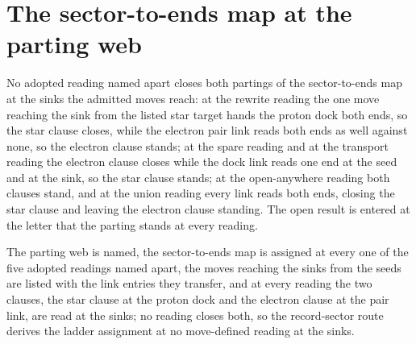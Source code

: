 \section{The sector-to-ends map at the parting web}\label{mod:I-5-D534928-w-smrp}
\begin{chwall}\label{box:I-5-D534928-w-smrp:1}
No adopted reading named apart closes both partings of the sector-to-ends map at the sinks the admitted moves reach: at the rewrite reading the one move reaching the sink from the listed star target hands the proton dock both ends, so the star clause closes, while the electron pair link reads both ends as well against none, so the electron clause stands; at the spare reading and at the transport reading the electron clause closes while the dock link reads one end at the seed and at the sink, so the star clause stands; at the open-anywhere reading both clauses stand, and at the union reading every link reads both ends, closing the star clause and leaving the electron clause standing. The open result is entered at the letter that the parting stands at every reading.
\end{chwall}
The parting web is named, the sector-to-ends map is assigned at every one of the five adopted readings named apart, the moves reaching the sinks from the seeds are listed with the link entries they transfer, and at every reading the two clauses, the star clause at the proton dock and the electron clause at the pair link, are read at the sinks; no reading closes both, so the record-sector route derives the ladder assignment at no move-defined reading at the sinks.


